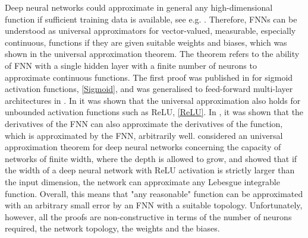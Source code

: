 Deep neural networks could approximate in general any high-dimensional function if sufficient training data is available, see e.g. \cite{ArzaniDawson:2021}. Therefore, FNNs can be understood as universal approximators for vector-valued, measurable, especially continuous, functions if they are given suitable weights and biases, which was shown in the universal approximation theorem. The theorem refers to the ability of FNN with a single hidden layer with a finite number of neurons to approximate continuous functions. The first proof was published in \cite{Cybenko:1989} for sigmoid activation functions, \cref{Sigmoid}, and was generalised to feed-forward multi-layer architectures in \cite{Hornik:1991}. In \cite{SonodaMurata:2017} it was shown that the universal approximation also holds for unbounded activation functions such as ReLU, \cref{ReLU}. In \cite{HornikStinchcombeWhite:1990}, it was shown that the derivatives of the FNN can also approximate the derivatives of the function, which is approximated by the FNN, arbitrarily well. \cite{LuPuWangHuWang:2017} considered an universal approximation theorem for deep neural networks concerning the capacity of networks of finite width, where the depth is allowed to grow, and showed that if the width of a deep neural network with ReLU activation is strictly larger than the input dimension, the network can approximate any Lebesgue integrable function. Overall, this means that "any reasonable" function can be approximated with an arbitrary small error by an FNN with a suitable topology. Unfortunately, however, all the proofs are non-constructive in terms of the number of neurons required, the network topology, the weights and the biases. \\

